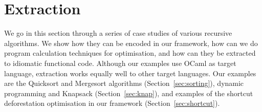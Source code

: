 \documentclass[a4paper,anonymous, UKenglish,cleveref, autoref, thm-restate]{lipics-v2021}
\newcommand{\mvol}[1]{\textcolor{blue}{\textsc{Michael}: #1}}
\begin{document}
\section{Extraction}
\label{sec:examples}
We go in this section through a series of case studies of various recursive
algorithms.  We show how they can be encoded in our framework, how can we do
program calculation techniques for optimisation, and how can they be extracted
to idiomatic functional code. Although our examples use OCaml as target
language, extraction works equally well to other target languages. Our examples
are the Quicksort and Mergesort algorithms (Section~\ref{sec:sorting}), dynamic
programming and Knapsack (Section~\ref{sec:knap}), and examples of the shortcut
deforestation optimisation in our framework (Section~\ref{sec:shortcut}).
\end{document}
